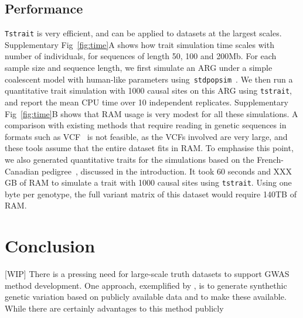 \documentclass[unnumsec,webpdf,modern,large,namedate]{oup-authoring-template}%
\begin{document}
\subsection{Performance}
\texttt{Tstrait} is very efficient, and can be applied to datasets at the
largest scales.
Supplementary Fig~\ref{fig:time}A shows how trait simulation time scales
with number of individuals, for sequences of length 50, 100 and 200Mb.
For each sample size and sequence length,
we first simulate an ARG under a simple coalescent model with
human-like parameters using~\texttt{stdpopsim}~\citep{adrion2020}.
We then run a quantitative trait simulation
with 1000 causal sites on this ARG using \texttt{tstrait},
and report the mean CPU time over 10 independent replicates.
Supplementary Fig~\ref{fig:time}B shows that RAM usage is very
modest for all these simulations.
A comparison with existing methods that require reading
in genetic sequences in formats such as
VCF~\citep[e.g.][]{meyer2018,fernandes2020} is not feasible,
as the VCFs involved are very large, and these tools assume that
the entire dataset fits in RAM.
To emphasise this point, we also generated
quantitative traits for the simulations based on
the French-Canadian pedigree~\citet{anderson2023}, discussed in
the introduction. It took 60 seconds and XXX GB of RAM to
simulate a trait with 1000 causal sites using \texttt{tstrait}.
Using one byte per genotype, the full variant matrix of this
dataset would require 140TB of RAM.


\section{Conclusion}
[WIP]
There is a pressing need for large-scale truth datasets to support
GWAS method development. One approach, exemplified by
\citet{wharrie2023hapnest}, is to generate synthethic genetic variation
based on publicly available data and to make these available. While
there are certainly advantages to this method
publicly
\end{document}
